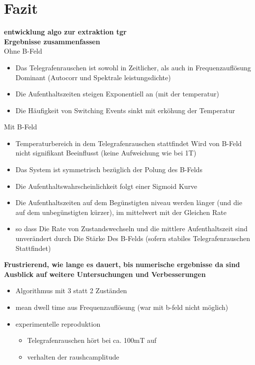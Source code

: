 \documentclass[main.tex]{subfiles}
\begin{document}
\newpage
\section{Fazit}

\textbf{entwicklung algo zur extraktion tgr}\\

\textbf{Ergebnisse zusammenfassen}\\
Ohne B-Feld
\begin{itemize}
    \item Das Telegrafenrauschen ist sowohl in Zeitlicher, als auch in Frequenzauflösung Dominant (Autocorr und Spektrale leistungsdichte)
    \item Die Aufenthaltszeiten steigen Exponentiell an (mit der temperatur)
    \item Die Häufigkeit von Switching Events sinkt mit erköhung der Temperatur
\end{itemize}

Mit B-Feld
\begin{itemize}
    \item Temperaturbereich in dem Telegrafenrauschen stattfindet Wird von B-Feld nicht signifikant Beeinflusst (keine Aufweichung wie bei 1T)
    \item Das System ist symmetrisch bezüglich der Polung des B-Felds 
    \item Die Aufenthaltswahrscheinlichkeit folgt einer Sigmoid Kurve
    \item Die Aufenthaltszeiten auf dem Begünstigten niveau werden länger (und die auf dem unbegünstigten kürzer), im mittelwert mit der Gleichen Rate
    \item so dass Die Rate von Zustandswechseln und die mittlere Aufenthaltszeit sind unverändert durch Die Stärke Des B-Felds (sofern stabiles Telegrafenrauschen Stattfindet)
\end{itemize}

\textbf{Frustrierend, wie lange es dauert, bis numerische ergebnisse da sind}\\
\textbf{Ausblick auf weitere Untersuchungen und Verbesserungen}
\begin{itemize}
    \item Algorithmus mit 3 statt 2 Zuständen
    \item mean dwell time aus Frequenzauflösung (war mit b-feld nicht möglich)
    \item experimentelle reproduktion 
    \begin{itemize}
        \item Telegrafenrauschen hört bei ca. 100mT auf
        \item verhalten der raushcamplitude
    \end{itemize}
\end{itemize}
\end{document}

